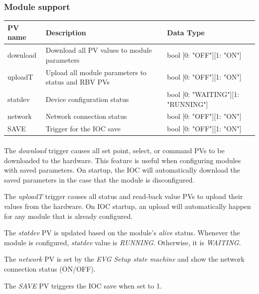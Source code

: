 \documentclass[openany]{article}
\begin{document}
		\subsubsection{Module support}\label{pvgroup:evre-module-support}
			\begin{center}
			\begin{tabular}{| m{2.8cm} m{6cm} m{6cm} |}
			    \hline
			    \bfseries PV name & \bfseries Description & \bfseries Data Type \\ \hline
			    download & Download all PV values to module parameters & bool [0: "OFF"][1: "ON"] \\ \hline
			    uploadT & Upload all module parameters to status and RBV PVs & bool [0: "OFF"][1: "ON"] \\ \hline
			    statdev & Device configuration status & bool [0: "WAITING"][1: "RUNNING"] \\ \hline
			    network & Network connection status & bool [0: "OFF"][1: "ON"] \\ \hline
			    SAVE & Trigger for the IOC save & bool [0: "OFF"][1: "ON"] \\ \hline
			\end{tabular}
			\end{center}

			\paragraph{} The \emph{download} trigger causes all set point, select, or command PVs to be downloaded to the hardware. This feature is useful when configuring modules with saved parameters. On startup, the IOC will automatically download the saved parameters in the case that the module is disconfigured.
			\par The \emph{uploadT} trigger causes all status and read-back value PVs to upload their values from the hardware. On IOC startup, an upload will automatically happen for any module that is already configured.
			\par The \emph{statdev} PV is updated based on the module's \emph{alive} status. Whenever the module is configured, \emph{statdev} value is \emph{RUNNING}. Otherwise, it is \emph{WAITING}.
			\par The \emph{network} PV is set by the \emph{EVG Setup state machine} and show the network connection status (ON/OFF).
			\par The \emph{SAVE} PV triggers the IOC save when set to 1.

\end{document}
